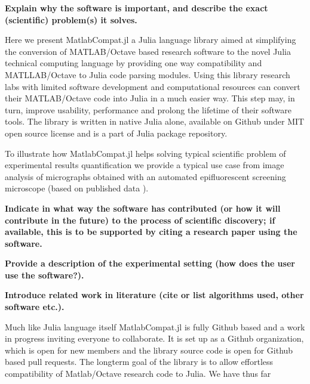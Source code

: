 \textbf{Explain why the software is important, and describe the exact (scientific) problem(s) it solves.}

Here we present MatlabCompat.jl a Julia language library aimed at simplifying the conversion of MATLAB/Octave based research software to the novel Julia technical computing language by providing one way compatibility and MATLLAB/Octave to Julia code parsing modules. Using this library research labs with limited software development and computational resources can convert their MATLAB/Octave code into Julia in a much easier way. This step may, in turn, improve usability, performance and prolong the lifetime of their software tools. The library is written in native Julia alone, available on Github under MIT open source license and is a part of Julia package repository.

To illustrate how MatlabCompat.jl helps solving typical scientific problem of experimental results quantification we provide a typical use case from image analysis of micrographs obtained with an automated epifluorescent screening microscope (based on published data \cite{22787215}).

\textbf{Indicate in what way the software has contributed (or how it will contribute in the future) to the process of scientific discovery; if available, this is to be supported by citing a research paper using the software.}


\textbf{Provide a description of the experimental setting (how does the user use the software?).}


\textbf{Introduce related work in literature (cite or list algorithms used, other software etc.).}

Much like Julia language itself MatlabCompat.jl is fully Github based and a work in progress inviting everyone to collaborate. It is set up as a Github organization, which is open for new members and the library source code is open for Github based pull requests. The longterm goal of the library is to allow effortless compatibility of Matlab/Octave research code to Julia. We have thus far
    
    
    
    
    
    
    
    
    
    
    
    
    
    
    
    
    
  
  
  
  